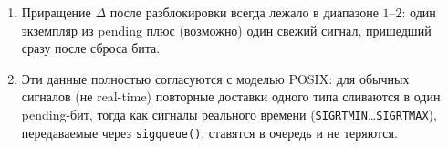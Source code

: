 \begin{enumerate}
\begin{enumerate}
            \item Приращение $\Delta$ после разблокировки всегда лежало в диапазоне $1$--$2$: один экземпляр из pending плюс (возможно) один свежий сигнал, пришедший сразу после сброса бита.

            \item Эти данные полностью согласуются с моделью POSIX: для обычных сигналов (не real-time) повторные доставки одного типа сливаются в один pending-бит, тогда как сигналы реального времени (\texttt{SIGRTMIN}\dots\texttt{SIGRTMAX}), передаваемые через \texttt{sigqueue()}, ставятся в очередь и не теряются.
        \end{enumerate}
    \end{enumerate}